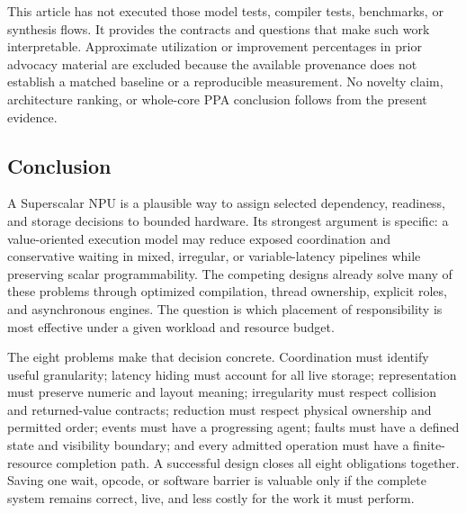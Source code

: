 This article has not executed those model tests, compiler tests, benchmarks, or synthesis flows. It provides the contracts and questions that make such work interpretable. Approximate utilization or improvement percentages in prior advocacy material are excluded because the available provenance does not establish a matched baseline or a reproducible measurement. No novelty claim, architecture ranking, or whole-core PPA conclusion follows from the present evidence.

\subsection{Conclusion}

A Superscalar NPU is a plausible way to assign selected dependency, readiness, and storage decisions to bounded hardware. Its strongest argument is specific: a value-oriented execution model may reduce exposed coordination and conservative waiting in mixed, irregular, or variable-latency pipelines while preserving scalar programmability. The competing designs already solve many of these problems through optimized compilation, thread ownership, explicit roles, and asynchronous engines. The question is which placement of responsibility is most effective under a given workload and resource budget.

The eight problems make that decision concrete. Coordination must identify useful granularity; latency hiding must account for all live storage; representation must preserve numeric and layout meaning; irregularity must respect collision and returned-value contracts; reduction must respect physical ownership and permitted order; events must have a progressing agent; faults must have a defined state and visibility boundary; and every admitted operation must have a finite-resource completion path. A successful design closes all eight obligations together. Saving one wait, opcode, or software barrier is valuable only if the complete system remains correct, live, and less costly for the work it must perform.
